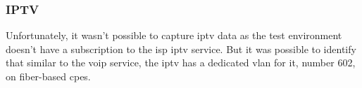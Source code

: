 \subsubsection{IPTV}

Unfortunately, it wasn’t possible to capture \gls{iptv} data as the test environment doesn’t have a subscription to the \gls{isp} \gls{iptv} service. But it was possible to identify that similar to the \gls{voip} service, the \gls{iptv} has a dedicated \gls{vlan} for it, number 602, on fiber-based \gls{cpe}s.
